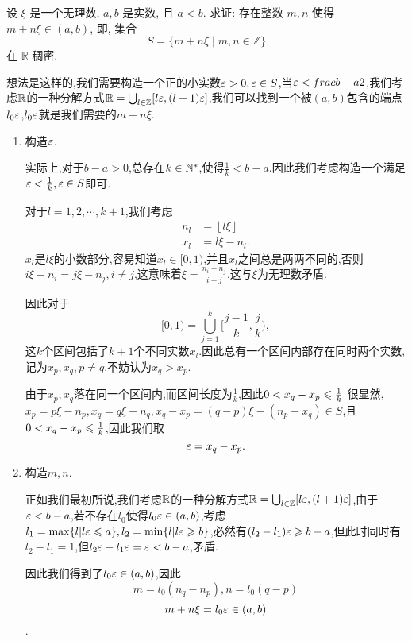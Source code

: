 \begin{exercise}[1.C.16]
    设 $\xi$ 是一个无理数, $a,b$ 是实数, 且 $a<b$. 求证: 存在整数 $m,n$ 使得 $m+n\xi \in (a,b)$, 即, 集合
    $$ S = \{m+n\xi \mid m, n \in \mathbb{Z}\} $$
    在 $\mathbb{R}$ 稠密.
\end{exercise}
\begin{solution}
    想法是这样的,我们需要构造一个正的小实数$\varepsilon>0,\varepsilon\in S$,当$\varepsilon<frac{b-a}{2}$,我们考虑$\mathbb{R}$的一种分解方式$\mathbb{R}=\bigcup_{l\in\mathbb{Z}}[l\varepsilon,(l+1)\varepsilon]$,我们可以找到一个被$(a,b)$包含的端点$l_0\varepsilon$,$l_0\varepsilon$就是我们需要的$m+n\xi$.

    \begin{enumerate}
        \item 构造$\varepsilon$.
        
        实际上,对于$b-a>0$,总存在$k\in\mathbb{N}^*$,使得$\frac{1}{k}<b-a$.因此我们考虑构造一个满足$\varepsilon<\frac{1}{k},\varepsilon\in S$即可.

        对于$l=1,2,\cdots,k+1$,我们考虑
        \begin{align*}
            n_l&=\left\lfloor l\xi \right\rfloor \\
            x_l&=l\xi-n_l.
        \end{align*}
        $x_l$是$l\xi$的小数部分,容易知道$x_l\in[0,1)$,并且$x_l$之间总是两两不同的,否则$i\xi-n_i=j\xi-n_j,i\neq j$,这意味着$\xi=\frac{n_i-n_j}{i-j}$,这与$\xi$为无理数矛盾.

        因此对于$$[0,1)=\bigcup_{j=1}^{k}[ \frac{j-1}{k},\frac{j}{k}),$$
        这$k$个区间包括了$k+1$个不同实数$x_l$.因此总有一个区间内部存在同时两个实数,记为$x_p,x_q,p\neq q$,不妨认为$x_q>x_p$.
        
        由于$x_p,x_q$落在同一个区间内,而区间长度为$\frac{1}{k}$,因此$0<x_q-x_p\leqslant\frac{1}{k}$
        很显然,$x_p=p\xi-n_p,x_q=q\xi-n_q,x_q-x_p=(q-p)\xi-(n_p-x_q)\in S$,且$0<x_q-x_p\leqslant\frac{1}{k}$,因此我们取$$\varepsilon=x_q-x_p.$$

        \item 构造$m,n$.
        
        正如我们最初所说,我们考虑$\mathbb{R}$的一种分解方式$\mathbb{R}=\bigcup_{l\in\mathbb{Z}}[l\varepsilon,(l+1)\varepsilon]$,由于$\varepsilon<b-a$,若不存在$l_0$使得$l_0\varepsilon\in(a,b)$,考虑$l_1=\max\{l|l\varepsilon\leqslant a\},l_2=\min\{l|l\varepsilon\geqslant b\}$,必然有$(l_2-l_1)\varepsilon\geqslant b-a$,但此时同时有$l_2-l_1=1$,但$l_2\varepsilon-l_1\varepsilon=\varepsilon<b-a$,矛盾.

        因此我们得到了$l_0\varepsilon\in(a,b)$,因此$$m=l_0(n_q-n_p),n=l_0(q-p)$$
        $$m+n\xi=l_0\varepsilon\in(a,b)$$.
    \end{enumerate}
\end{solution}